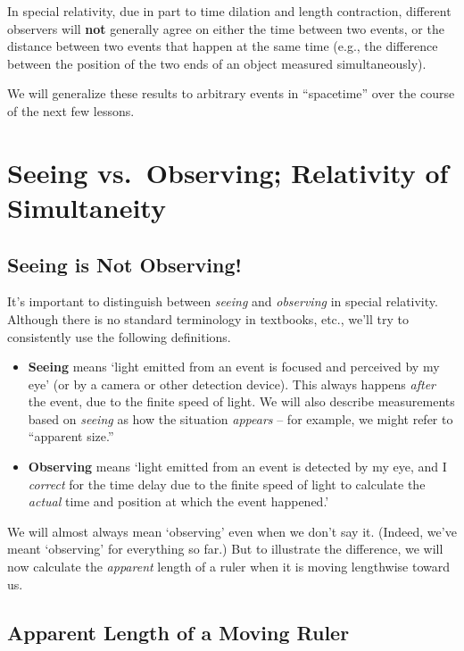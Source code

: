 \documentclass[11pt, letterpaper, openany]{book}
\begin{document}
In special relativity, due in part to time dilation and length contraction, different observers will \textbf{not} generally agree on either the time between two events, or the distance between two events that happen at the same time (e.g., the difference between the position of the two ends of an object measured simultaneously).

We will generalize these results to arbitrary events in ``spacetime'' over the course of the next few lessons.

\chapter{Seeing vs.\ Observing; Relativity of Simultaneity}

\section{Seeing is Not Observing!}

It's important to distinguish between \textit{seeing} and \textit{observing} in special relativity. Although there is no standard terminology in textbooks, etc., we'll try to consistently use the following definitions.

\begin{itemize}
    \item \textbf{Seeing} means `light emitted from an event is focused and perceived by my eye' (or by a camera or other detection device). This always happens \textit{after} the event, due to the finite speed of light. We will also describe measurements based on \textit{seeing} as how the situation \textit{appears} -- for example, we might refer to ``apparent size.''
    \item \textbf{Observing} means `light emitted from an event is detected by my eye, and I \textit{correct} for the time delay due to the finite speed of light to calculate the \textit{actual} time and position at which the event happened.'
\end{itemize}

We will almost always mean `observing' even when we don't say it. (Indeed, we've meant `observing' for everything so far.) But to illustrate the difference, we will now calculate the \textit{apparent} length of a ruler when it is moving lengthwise toward us.

\section{Apparent Length of a Moving Ruler}
\end{document}
